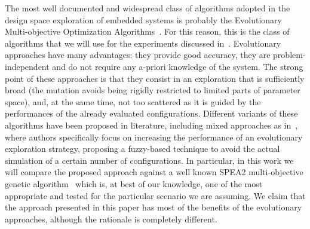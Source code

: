 The most well documented and widespread class of algorithms adopted in the
design space exploration of embedded systems is probably the Evolutionary
Multi-objective Optimization Algorithms~\cite{coello_easmop}. For this
reason, this is the class of algorithms that we will use for the
experiments discussed in~.
Evolutionary approaches have many advantages: they provide good accuracy, they are
problem-independent and do not require any a-priori knowledge of the
system. The strong point of these approaches is that they consist in an exploration that is sufficiently broad
(the mutation avoids being rigidly restricted to limited parts of
parameter space), and, at the same time, not too scattered as it is
guided by the performances of the already evaluated configurations.
Different variants of these algorithms have been proposed in
literature, including mixed approaches as in~\cite{Ascia2011382},
where authors specifically focus on increasing the performance of an
evolutionary exploration strategy, proposing a fuzzy-based technique
to avoid the actual simulation of a certain number of configurations.
In particular, in this work we will compare the proposed approach against a
well known SPEA2 multi-objective genetic algorithm~\cite{knowles_techrep06}
which is, at best of our knowledge, one of the most appropriate and
tested for the particular scenario we are assuming.  We
claim that the approach presented in this paper has most of the
benefits of the evolutionary approaches, although the rationale is
completely different.
